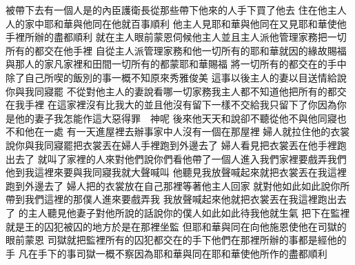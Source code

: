 \bchapter%
被帶下去\yuentien 有一個人是的內臣\chientien 護衛長\chientien 從那些帶下他來的人手下買了他去\chuan 
{}住在他主人人的家中\yuentien 耶和華與他同在\chientien 他就百事順利\chuan 
{}他主人見耶和華與他同在\chientien 又見耶和華使他手裡所辦的盡都順利\chuan 
{}就在主人眼前蒙恩\chientien 伺候他主人\chientien 並且主人派他管理家務\chientien 把一切所有的都交在他手裡\chuan 
{}自從主人派管理家務\chientien 和他一切所有的\chientien 耶和華就因的緣故\chientien 賜福與那人的家\yuentien 凡家裡和田間一切所有的\chientien 都蒙耶和華賜福\chuan 
{}將一切所有的\chientien 都交在的手中\chientien 除了自己所喫的飯\chientien 別的事一概不知\yuentien{}原來秀雅俊美\chuan\Chuan
{}這事以後\chientien{}主人的妻以目送情給\chientien 說\chientien 你與我同寢罷\chuan 
{}不從\chientien 對他主人的妻說\chientien 看哪\chientien 一切家務\chientien 我主人都不知道\chientien 他把所有的都交在我手裡\chuan 
{}在這家裡沒有比我大的\chientien 並且他沒有留下一樣不交給我\chientien 只留下了你\chientien 因為你是他的妻子\chientien 我怎能作這大惡\chientien 得罪　神呢\chuan 
{}後來他天天和說\chientien{}卻不聽從他\chientien 不與他同寢\chientien 也不和他在一處\chuan 
{}有一天\chientien{}進屋裡去辦事\chientien 家中人沒有一個在那屋裡\chuan 
{}婦人就拉住他的衣裳說\chientien 你與我同寢罷\yuentien{}把衣裳丟在婦人手裡\chientien 跑到外邊去了\chuan 
{}婦人看見把衣裳丟在他手裡跑出去了\chientien 
{}就叫了家裡的人來\chientien 對他們說\chientien 你們看\chientien 他帶了一個人\chientien 進入我們家裡\chientien 要戲弄我們\yuentien 他到我這裡來\chientien 要與我同寢\chientien 我就大聲喊叫\yuentien 
{}他聽見我放聲喊起來\chientien 就把衣裳丟在我這裡\chientien 跑到外邊去了\chuan 
{}婦人把的衣裳放在自己那裡\chientien 等著他主人回家\chientien 
{}就對他如此如此說\chientien 你所帶到我們這裡的那僕人\chientien 進來要戲弄我\yuentien 
{}我放聲喊起來\chientien 他就把衣裳丟在我這裡跑出去了\chuan\Chuan
{}的主人聽見他妻子對他所說的話\chientien 說\chientien 你的僕人如此如此待我\chientien 他就生氣\yuentien 
{}把下在監裡\chientien 就是王的囚犯被囚的地方\yuentien 於是在那裡坐監\chuan 
{}但耶和華與同在\chientien 向他施恩\chientien 使他在司獄的眼前蒙恩\chuan 
{}司獄就把監裡所有的囚犯\chientien 都交在的手下\chientien 他們在那裡所辦的事\chientien 都是經他的手\chuan 
{}凡在手下的事\chientien 司獄一概不察\chientien 因為耶和華與同在\chientien 耶和華使他所作的盡都順利\chuan 
